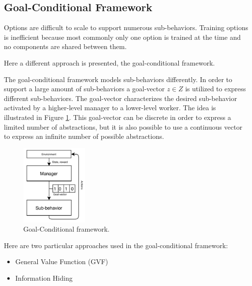 \subsection{Goal-Conditional Framework}

Options are difficult to scale to support numerous sub-behaviors. Training options is inefficient because most commonly only
one option is trained at the time and no components are shared between them.

Here a different approach is presented, the goal-conditional framework.

The goal-conditional framework models sub-behaviors differently. In order to support a large amount of sub-behaviors
a goal-vector $z \in Z$ is utilized to express different sub-behaviors.
The goal-vector characterizes the desired sub-behavior activated by a higher-level manager to a lower-level worker.
The idea is illustrated in Figure \ref{fig:goal-conditional}. This goal-vector can be discrete in order to express
a limited number of abstractions, but it is also possible to use a continuous vector to express an infinite number of possible abstractions.


\begin{figure}
    \centering
    \includegraphics[width=0.3\textwidth]{Images/goal-conditional.png}
    \caption{Goal-Conditional framework.}
    \label{fig:goal-conditional}
\end{figure}

Here are two particular approaches used in the goal-conditional framework:

\begin{itemize}
    \item General Value Function (GVF)
    \item Information Hiding
\end{itemize}

